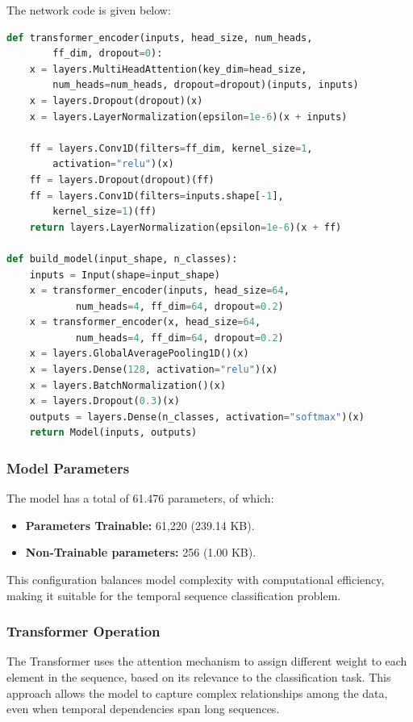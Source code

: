 \documentclass[a4paper,final,12pt]{report}
\begin{document}
The network code is given below:
\begin{lstlisting}[language=Python, caption=Architecture of the Transformer model]
def transformer_encoder(inputs, head_size, num_heads, 
        ff_dim, dropout=0):
    x = layers.MultiHeadAttention(key_dim=head_size, 
        num_heads=num_heads, dropout=dropout)(inputs, inputs)
    x = layers.Dropout(dropout)(x)
    x = layers.LayerNormalization(epsilon=1e-6)(x + inputs)

    ff = layers.Conv1D(filters=ff_dim, kernel_size=1, 
        activation="relu")(x)
    ff = layers.Dropout(dropout)(ff)
    ff = layers.Conv1D(filters=inputs.shape[-1],
        kernel_size=1)(ff)
    return layers.LayerNormalization(epsilon=1e-6)(x + ff)

def build_model(input_shape, n_classes):
    inputs = Input(shape=input_shape)
    x = transformer_encoder(inputs, head_size=64, 
            num_heads=4, ff_dim=64, dropout=0.2)
    x = transformer_encoder(x, head_size=64, 
            num_heads=4, ff_dim=64, dropout=0.2)
    x = layers.GlobalAveragePooling1D()(x)
    x = layers.Dense(128, activation="relu")(x)
    x = layers.BatchNormalization()(x)
    x = layers.Dropout(0.3)(x)
    outputs = layers.Dense(n_classes, activation="softmax")(x)
    return Model(inputs, outputs)
\end{lstlisting}

\subsubsection{Model Parameters}
The model has a total of 61.476 parameters, of which:
\begin{itemize}
    \item \textbf{Parameters Trainable:} 61,220 (239.14 KB).
    \item \textbf{Non-Trainable parameters:} 256 (1.00 KB).
\end{itemize}
This configuration balances model complexity with computational efficiency, making it suitable for the temporal sequence classification problem.

\subsubsection{Transformer Operation}
The Transformer uses the attention mechanism to assign different weight to each element in the sequence, based on its relevance to the classification task. This approach allows the model to capture complex relationships among the data, even when temporal dependencies span long sequences.\\
\end{document}
